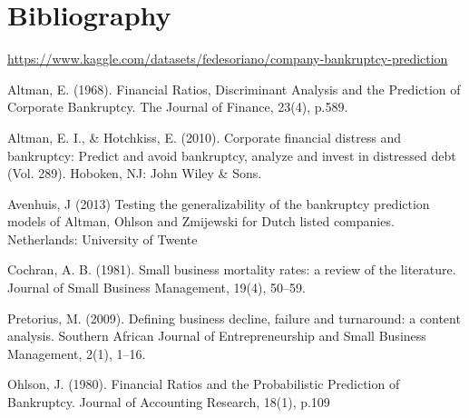 \documentclass[
]{article}
\begin{document}
\hypertarget{bibliography}{%
\section{Bibliography}\label{bibliography}}

\url{https://www.kaggle.com/datasets/fedesoriano/company-bankruptcy-prediction}

Altman, E. (1968). Financial Ratios, Discriminant Analysis and the
Prediction of Corporate Bankruptcy. The Journal of Finance, 23(4),
p.589.

Altman, E. I., \& Hotchkiss, E. (2010). Corporate financial distress and
bankruptcy: Predict and avoid bankruptcy, analyze and invest in
distressed debt (Vol. 289). Hoboken, NJ: John Wiley \& Sons.

Avenhuis, J (2013) Testing the generalizability of the bankruptcy
prediction models of Altman, Ohlson and Zmijewski for Dutch listed
companies. Netherlands: University of Twente

Cochran, A. B. (1981). Small business mortality rates: a review of the
literature. Journal of Small Business Management, 19(4), 50--59.

Pretorius, M. (2009). Defining business decline, failure and turnaround:
a content analysis. Southern African Journal of Entrepreneurship and
Small Business Management, 2(1), 1--16.

Ohlson, J. (1980). Financial Ratios and the Probabilistic Prediction of
Bankruptcy. Journal of Accounting Research, 18(1), p.109
\end{document}
